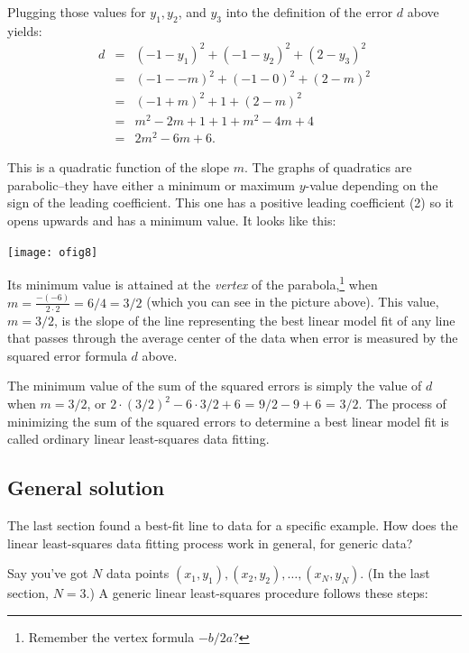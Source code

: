 \documentclass[10pt]{article}
\begin{document}
Plugging those values for $y_1, y_2$, and $y_3$ into the definition of the error
$d$ above  yields:
\[
\begin{array}{lcl}
d &=& (-1 - y_1)^2 + (-1 -y_2)^2 + (2 - y_3)^2\\
&=& (-1 - -m)^2 + (-1 - 0)^2 + (2 - m)^2\\
&=& (-1 + m)^2 + 1 + (2 - m)^2\\
&=& m^2 -2m + 1 + 1 + m^2 - 4m + 4\\
&=& 2m^2 - 6m + 6.
\end{array}
\]

This is a quadratic function of the slope $m$. The graphs of quadratics are
parabolic--they have either a minimum or maximum $y$-value depending on the
sign of the leading coefficient.  This one has a positive leading coefficient
(2) so it opens upwards and has a minimum value. It looks like this:

\begin{center}
\texttt{[image: ofig8]}
\end{center}

Its minimum value is attained at the {\it vertex} of the
parabola,\footnote{Remember the vertex formula $-b/2a$?} when $m = \frac{-
(-6)}{2\cdot 2} = 6/4 = 3/2$ (which you can see in the picture above).  This
value, $m=3/2$, is the slope of the line representing the best linear model fit
of any line that passes through the average center of the data when error
is measured by the squared error formula $d$ above.

The minimum value of the sum of the squared errors is simply the value of $d$
when $m=3/2$, or $2\cdot(3/2)^2 - 6\cdot3/2 + 6$ = $9/2 - 9 + 6$ = $3/2$.  The
process of minimizing the sum of the squared errors to determine a best linear
model fit is called ordinary linear least-squares data fitting.


\subsection*{General solution}

The last section found a best-fit line to data for a specific example. How does
the linear least-squares data fitting process work in general, for generic
data?

Say you've got $N$ data points $(x_1, y_1), (x_2, y_2), \ldots, (x_N, y_N)$.
(In the last section, $N=3$.) A generic linear least-squares procedure
follows these steps:
\end{document}
